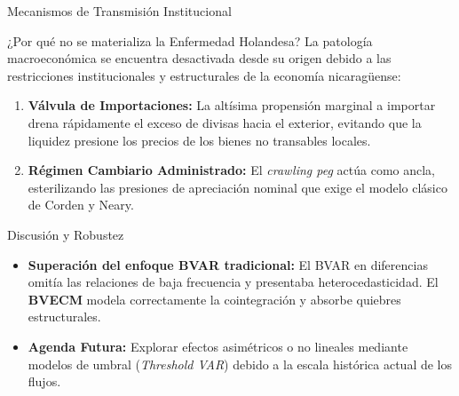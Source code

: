 \documentclass[
  10pt,
  ignorenonframetext,
  aspectratio=169,
  spanish,
]{beamer}
\providecommand{\tightlist}{%
  \setlength{\itemsep}{0pt}\setlength{\parskip}{0pt}}
\begin{document}
\begin{frame}{Mecanismos de Transmisión Institucional}
\protect{}\label{mecanismos-de-transmisiuxf3n-institucional}
\begin{block}{¿Por qué no se materializa la Enfermedad Holandesa?}
\protect{}\label{por-quuxe9-no-se-materializa-la-enfermedad-holandesa}
La patología macroeconómica se encuentra desactivada desde su origen
debido a las restricciones institucionales y estructurales de la
economía nicaragüense:
\end{block}

\vspace{0.3cm}

\begin{enumerate}
\tightlist
\item
  \textbf{Válvula de Importaciones:} La altísima propensión marginal a
  importar drena rápidamente el exceso de divisas hacia el exterior,
  evitando que la liquidez presione los precios de los bienes no
  transables locales.
\item
  \textbf{Régimen Cambiario Administrado:} El \emph{crawling peg} actúa
  como ancla, esterilizando las presiones de apreciación nominal que
  exige el modelo clásico de Corden y Neary.
\end{enumerate}
\end{frame}

\begin{frame}{Discusión y Robustez}
\protect{}\label{discusiuxf3n-y-robustez}
\begin{block}{}
\protect{}\label{section}
\begin{itemize}
\tightlist
\item
  \textbf{Superación del enfoque BVAR tradicional:} El BVAR en
  diferencias omitía las relaciones de baja frecuencia y presentaba
  heterocedasticidad. El \textbf{BVECM} modela correctamente la
  cointegración y absorbe quiebres estructurales.
\item
  \textbf{Agenda Futura:} Explorar efectos asimétricos o no lineales
  mediante modelos de umbral (\emph{Threshold VAR}) debido a la escala
  histórica actual de los flujos.
\end{itemize}
\end{block}
\end{frame}
\end{document}
